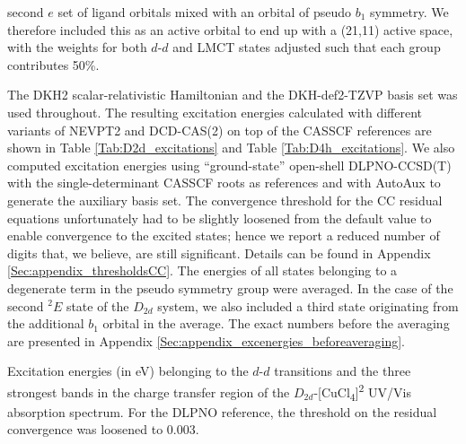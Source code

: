 second $e$ set of ligand orbitals mixed with an orbital of pseudo $b_1$ symmetry. We therefore included this as an active orbital to end up with a (21,11) active space, with the weights for both $d$-$d$ and LMCT states adjusted such that each group contributes 50\%.

The DKH2\cite{Hess_1986_3742, JanseH_1989_6016} scalar-relativistic Hamiltonian and the DKH-def2-TZVP\cite{PantaCLN_2008_908} basis set was used throughout. The resulting excitation energies calculated with different variants of NEVPT2 and DCD-CAS(2) on top of the CASSCF references are shown in Table \ref{Tab:D2d_excitations} and Table \ref{Tab:D4h_excitations}. We also computed excitation energies using ``ground-state'' open-shell DLPNO-CCSD(T)\cite{SaitoBRVN_2017_164105} with the single-determinant CASSCF roots as references and with AutoAux\cite{StoycAN_2017_554} to generate the auxiliary basis set. 
The convergence threshold for the CC residual equations unfortunately had to be slightly loosened from the default value to enable convergence to the excited states; hence we report a reduced number of digits that, we believe, are still significant.
Details can be found in Appendix \ref{Sec:appendix_thresholdsCC}. The energies of all states belonging to a degenerate term in the pseudo symmetry group were averaged. In the case of the second $^2E$ state of the $D_{2d}$ system, we also included a third state originating from the additional $b_1$ orbital in the average. The exact numbers before the averaging are presented in Appendix \ref{Sec:appendix_excenergies_beforeaveraging}.
\begin{table}
\small
\centering
\ttabbox
{\caption[Excitation energies belonging to the $d$-$d$ and charge transfer transitions of $D_{2d}$-{[CuCl\textsubscript{4}]}\textsuperscript{2\textminus}.]{Excitation energies (in eV) belonging to the $d$-$d$ transitions and the three strongest bands in the charge transfer region of the $D_{2d}$-[CuCl\textsubscript{4}]\textsuperscript{2\textminus} UV/Vis absorption spectrum. For the DLPNO reference, the threshold on the residual convergence was loosened to 0.003.}
\label{Tab:D2d_excitations}}
{
}
\end{table}
